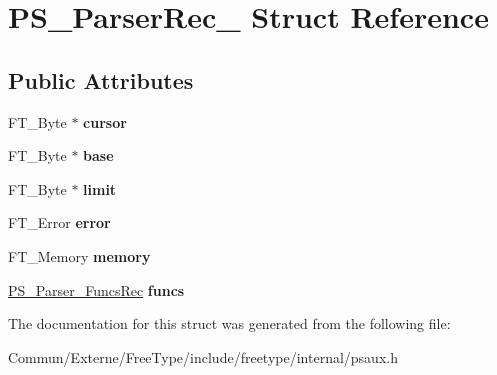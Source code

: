 \hypertarget{struct_p_s___parser_rec__}{}\section{P\+S\+\_\+\+Parser\+Rec\+\_\+ Struct Reference}
\label{struct_p_s___parser_rec__}
\subsection*{Public Attributes}
\begin{DoxyCompactItemize}
\item 
F\+T\+\_\+\+Byte $\ast$ {\bfseries cursor}\hypertarget{struct_p_s___parser_rec___a6ed189bc25c03814bdafad63819ddfe7}{}\label{struct_p_s___parser_rec___a6ed189bc25c03814bdafad63819ddfe7}

\item 
F\+T\+\_\+\+Byte $\ast$ {\bfseries base}\hypertarget{struct_p_s___parser_rec___a30528f6a9caffce2fd44ef2d5a38e5bd}{}\label{struct_p_s___parser_rec___a30528f6a9caffce2fd44ef2d5a38e5bd}

\item 
F\+T\+\_\+\+Byte $\ast$ {\bfseries limit}\hypertarget{struct_p_s___parser_rec___af3310795fd73530036fb32ec4385ea3d}{}\label{struct_p_s___parser_rec___af3310795fd73530036fb32ec4385ea3d}

\item 
F\+T\+\_\+\+Error {\bfseries error}\hypertarget{struct_p_s___parser_rec___a7a1432cb4d8bb603663f1258224c8ec4}{}\label{struct_p_s___parser_rec___a7a1432cb4d8bb603663f1258224c8ec4}

\item 
F\+T\+\_\+\+Memory {\bfseries memory}\hypertarget{struct_p_s___parser_rec___a3e2206deb6c0d73f51c8c71d5db1db1f}{}\label{struct_p_s___parser_rec___a3e2206deb6c0d73f51c8c71d5db1db1f}

\item 
\hyperlink{struct_p_s___parser___funcs_rec__}{P\+S\+\_\+\+Parser\+\_\+\+Funcs\+Rec} {\bfseries funcs}\hypertarget{struct_p_s___parser_rec___a450031fd9e77e55bf424dc64a8d2659d}{}\label{struct_p_s___parser_rec___a450031fd9e77e55bf424dc64a8d2659d}

\end{DoxyCompactItemize}


The documentation for this struct was generated from the following file\+:\begin{DoxyCompactItemize}
\item 
Commun/\+Externe/\+Free\+Type/include/freetype/internal/psaux.\+h\end{DoxyCompactItemize}
